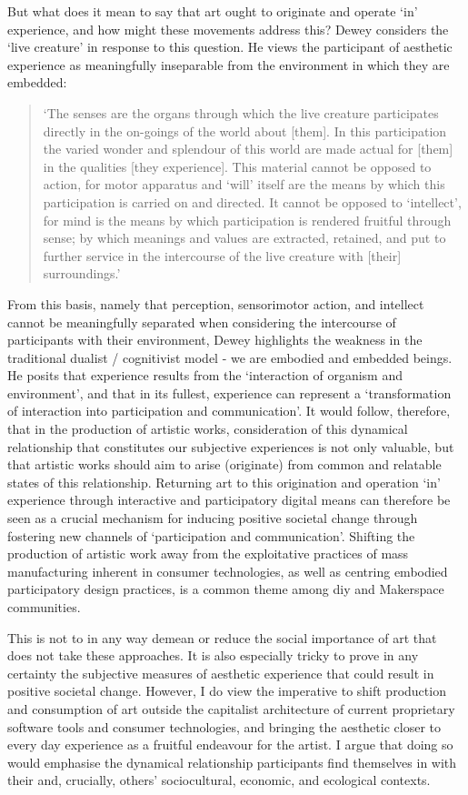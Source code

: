 But what does it mean to say that art ought to originate and operate `in' experience, and how might these movements address this? Dewey considers the `live creature' in response to this question. He views the participant of aesthetic experience as meaningfully inseparable from the environment in which they are embedded: 
\begin{quote}
    `The senses are the organs through which the live creature participates directly in the on-goings of the world about [them]. In this participation the varied wonder and splendour of this world are made actual for [them] in the qualities [they experience]. This material cannot be opposed to action, for motor apparatus and `will' itself are the means by which this participation is carried on and directed. It cannot be opposed to `intellect', for mind is the means by which participation is rendered fruitful through sense; by which meanings and values are extracted, retained, and put to further service in the intercourse of the live creature with [their] surroundings.' \citeyearpar[p. 22]{dewey1934}
\end{quote}
From this basis, namely that perception, sensorimotor action, and intellect cannot be meaningfully separated when considering the intercourse of participants with their environment, Dewey highlights the weakness in the traditional dualist / cognitivist model - we are embodied and embedded beings. He posits that experience results from the `interaction of organism and environment',  and that in its fullest, experience can represent a `transformation of interaction into participation and communication'. It would follow, therefore, that in the production of artistic works, consideration of this dynamical relationship that constitutes our subjective experiences is not only valuable, but that artistic works should aim to arise (originate) from common and relatable states of this relationship. Returning art to this origination and operation `in' experience through interactive and participatory digital means can therefore be seen as a crucial mechanism for inducing positive societal change through fostering new channels of `participation and communication'. Shifting the production of artistic work away from the exploitative practices of mass manufacturing inherent in consumer technologies, as well as centring embodied participatory design practices, is a common theme among \gls{diy} and Makerspace communities.

This is not to in any way demean or reduce the social importance of art that does not take these approaches. It is also especially tricky to prove in any certainty the subjective measures of aesthetic experience that could result in positive societal change. However, I do view the imperative to shift production and consumption of art outside the capitalist architecture of current proprietary software tools and consumer technologies, and bringing the aesthetic closer to every day experience as a fruitful endeavour for the artist. I argue that doing so would emphasise the dynamical relationship participants find themselves in with their and, crucially, others' sociocultural, economic, and ecological contexts.

